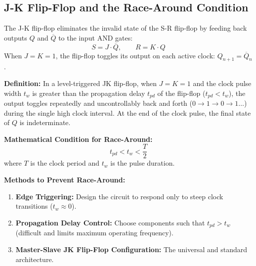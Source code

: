 \documentclass[12pt,a4paper]{article}
\begin{document}
\subsection{J-K Flip-Flop and the Race-Around Condition}
The J-K flip-flop eliminates the invalid state of the S-R flip-flop by feeding back outputs $Q$ and $\overline{Q}$ to the input AND gates:
\begin{equation}
  S = J \cdot \overline{Q}, \qquad R = K \cdot Q
\end{equation}
When $J = K = 1$, the flip-flop toggles its output on each active clock: $Q_{n+1} = \overline{Q}_n$.

\begin{tcolorbox}[defbox, title={\textbf{The Race-Around Condition in Level-Triggered JK Flip-Flops}}]
\textbf{Definition:} In a level-triggered JK flip-flop, when $J = K = 1$ and the clock pulse width $t_w$ is greater than the propagation delay $t_{pd}$ of the flip-flop ($t_{pd} < t_w$), the output toggles repeatedly and uncontrollably back and forth ($0 \to 1 \to 0 \to 1 \dots$) during the single high clock interval. At the end of the clock pulse, the final state of $Q$ is indeterminate.

\textbf{Mathematical Condition for Race-Around:}
\begin{equation}
  t_{pd} < t_w < \frac{T}{2}
\end{equation}
where $T$ is the clock period and $t_w$ is the pulse duration.

\textbf{Methods to Prevent Race-Around:}
\begin{enumerate}[label=\alph*., leftmargin=*]
  \item \textbf{Edge Triggering:} Design the circuit to respond only to steep clock transitions ($t_w \approx 0$).
  \item \textbf{Propagation Delay Control:} Choose components such that $t_{pd} > t_w$ (difficult and limits maximum operating frequency).
  \item \textbf{Master-Slave JK Flip-Flop Configuration:} The universal and standard architecture.
\end{enumerate}
\end{tcolorbox}
\end{document}
